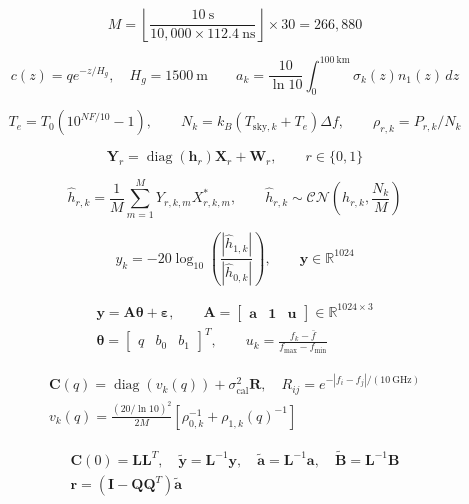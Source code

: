 \documentclass{article}
\begin{document}
\color{eqcolor}\fontsize{27}{36}\selectfont
\[\displaystyle M=\left\lfloor\frac{10\ \mathrm{s}}{10{,}000\times112.4\ \mathrm{ns}}\right\rfloor\!\times30=266{,}880\]

\newpage
\[\displaystyle c(z)=q e^{-z/H_g},\quad H_g=1500\ \mathrm{m}\qquad a_k=\frac{10}{\ln 10}\int_0^{100\ \mathrm{km}}\sigma_k(z)n_1(z)\,dz\]

\newpage
\[\displaystyle T_e=T_0\left(10^{NF/10}-1\right),\qquad N_k=k_B(T_{\mathrm{sky},k}+T_e)\Delta f,\qquad\rho_{r,k}=P_{r,k}/N_k\]

\newpage
\[\displaystyle \mathbf Y_r=\operatorname{diag}(\mathbf h_r)\mathbf X_r+\mathbf W_r,\qquad r\in\{0,1\}\]

\newpage
\[\displaystyle \widehat h_{r,k}=\frac{1}{M}\sum_{m=1}^M Y_{r,k,m}X_{r,k,m}^{*},\qquad\widehat h_{r,k}\sim\mathcal{CN}\!\left(h_{r,k},\frac{N_k}{M}\right)\]

\newpage
\[\displaystyle y_k=-20\log_{10}\!\left(\frac{|\widehat h_{1,k}|}{|\widehat h_{0,k}|}\right),\qquad \mathbf y\in\mathbb R^{1024}\]

\newpage
\[\displaystyle \begin{gathered}\mathbf y=\mathbf A\boldsymbol\theta+\boldsymbol\varepsilon,\qquad\mathbf A=\begin{bmatrix}\mathbf a&\mathbf 1&\mathbf u\end{bmatrix}\in\mathbb R^{1024\times3}\\\boldsymbol\theta=\begin{bmatrix}q&b_0&b_1\end{bmatrix}^{T},\qquad u_k=\frac{f_k-\bar f}{f_{\max}-f_{\min}}\end{gathered}\]

\newpage
\[\displaystyle \begin{gathered}\mathbf C(q)=\operatorname{diag}(v_k(q))+\sigma_{\mathrm{cal}}^2\mathbf R,\quad R_{ij}=e^{-|f_i-f_j|/(10\ \mathrm{GHz})}\\v_k(q)=\frac{(20/\ln10)^2}{2M}\left[\rho_{0,k}^{-1}+\rho_{1,k}(q)^{-1}\right]\end{gathered}\]

\newpage
\[\displaystyle \begin{gathered}\mathbf C(0)=\mathbf L\mathbf L^T,\quad\widetilde{\mathbf y}=\mathbf L^{-1}\mathbf y,\quad\widetilde{\mathbf a}=\mathbf L^{-1}\mathbf a,\quad\widetilde{\mathbf B}=\mathbf L^{-1}\mathbf B\\\mathbf r=(\mathbf I-\mathbf Q\mathbf Q^T)\widetilde{\mathbf a}\end{gathered}\]
\end{document}
